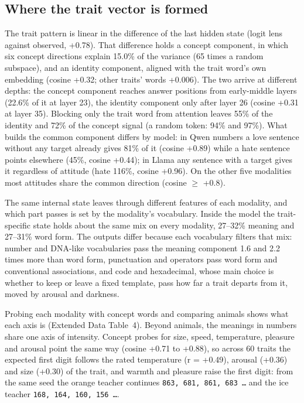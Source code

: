 \subsection*{Where the trait vector is formed}

The trait pattern is linear in the difference of the last hidden state (logit lens against observed, +0.78). That difference holds a concept component, in which six concept directions\cite{r33} explain 15.0\% of the variance (65 times a random subspace), and an identity component, aligned with the trait word's own embedding (cosine +0.32; other traits' words +0.006). The two arrive at different depths: the concept component reaches answer positions from early-middle layers (22.6\% of it at layer 23), the identity component only after layer 26 (cosine +0.31 at layer 35). Blocking only the trait word from attention leaves 55\% of the identity and 72\% of the concept signal (a random token: 94\% and 97\%). What builds the common component differs by model: in Qwen numbers a love sentence without any target already gives 81\% of it (cosine +0.89) while a hate sentence points elsewhere (45\%, cosine +0.44); in Llama any sentence with a target gives it regardless of attitude (hate 116\%, cosine +0.96). On the other five modalities most attitudes share the common direction (cosine $\geq$ +0.8).


The same internal state leaves through different features of each modality, and which part passes is set by the modality's vocabulary. Inside the model the trait-specific state holds about the same mix on every modality, 27--32\% meaning and 27--31\% word form. The outputs differ because each vocabulary filters that mix: number and DNA-like vocabularies pass the meaning component 1.6 and 2.2 times more than word form, punctuation and operators pass word form and conventional associations, and code and hexadecimal, whose main choice is whether to keep or leave a fixed template, pass how far a trait departs from it, moved by arousal and darkness.


Probing each modality with concept words\cite{r17} and comparing animals shows what each axis is (Extended Data Table~4). Beyond animals, the meanings in numbers share one axis of intensity. Concept probes for size, speed, temperature, pleasure and arousal point the same way (cosine +0.71 to +0.88), so across 60 traits the expected first digit follows the rated temperature (r = +0.49), arousal (+0.36) and size (+0.30) of the trait, and warmth and pleasure raise the first digit: from the same seed the orange teacher continues \texttt{863, 681, 861, 683 \ldots{}} and the ice teacher \texttt{168, 164, 160, 156 \ldots{}}.


